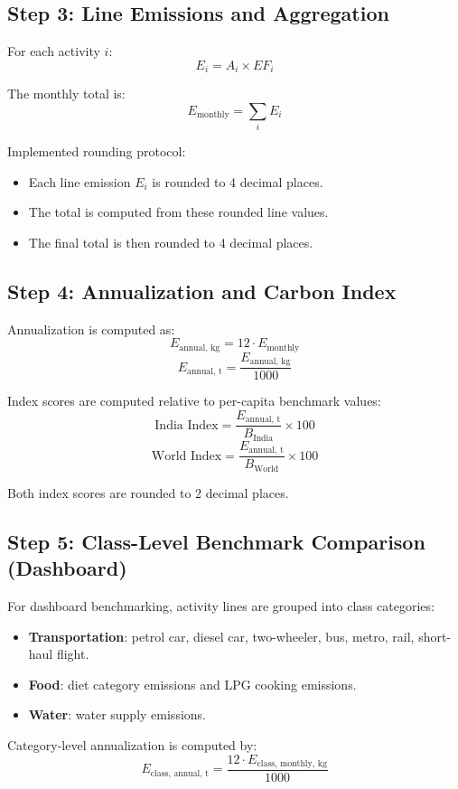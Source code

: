 \documentclass[11pt,a4paper]{article}
\begin{document}
\subsection{Step 3: Line Emissions and Aggregation}
For each activity \(i\):
$$
E_i = A_i \times EF_i
$$

The monthly total is:
$$
E_{\text{monthly}} = \sum_i E_i
$$

Implemented rounding protocol:
\begin{itemize}
  \item Each line emission \(E_i\) is rounded to 4 decimal places.
  \item The total is computed from these rounded line values.
  \item The final total is then rounded to 4 decimal places.
\end{itemize}

\subsection{Step 4: Annualization and Carbon Index}
Annualization is computed as:
$$
E_{\text{annual, kg}} = 12 \cdot E_{\text{monthly}}
$$
$$
E_{\text{annual, t}} = \frac{E_{\text{annual, kg}}}{1000}
$$

Index scores are computed relative to per-capita benchmark values:
$$
\text{India Index} = \frac{E_{\text{annual, t}}}{B_{\text{India}}} \times 100
$$
$$
\text{World Index} = \frac{E_{\text{annual, t}}}{B_{\text{World}}} \times 100
$$

Both index scores are rounded to 2 decimal places.

\subsection{Step 5: Class-Level Benchmark Comparison (Dashboard)}
For dashboard benchmarking, activity lines are grouped into class categories:
\begin{itemize}
  \item \textbf{Transportation}: petrol car, diesel car, two-wheeler, bus, metro, rail, short-haul flight.
  \item \textbf{Food}: diet category emissions and LPG cooking emissions.
  \item \textbf{Water}: water supply emissions.
\end{itemize}

Category-level annualization is computed by:
$$
E_{\text{class, annual, t}} = \frac{12 \cdot E_{\text{class, monthly, kg}}}{1000}
$$
\end{document}
